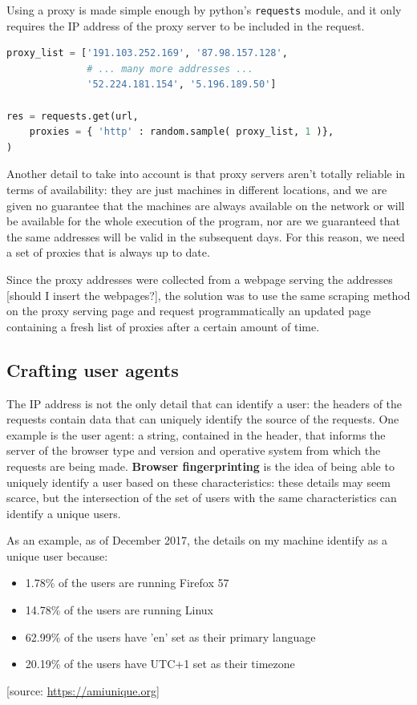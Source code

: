 \documentclass[LaM,binding=0.6cm]{sapthesis}
\begin{document}
Using a proxy is made simple enough by python's \texttt{requests} module, and it only requires the IP address of the proxy server to be included in the request.  
\\
\begin{lstlisting}[language=python,firstnumber=1]
proxy_list = ['191.103.252.169', '87.98.157.128', 
              # ... many more addresses ...
              '52.224.181.154', '5.196.189.50']

res = requests.get(url,
    proxies = { 'http' : random.sample( proxy_list, 1 )},
)
\end{lstlisting}

Another detail to take into account is that proxy servers aren't totally reliable in terms of availability: they are just machines in different locations, and we are given no guarantee that the machines are always available on the network or will be available for the whole execution of the program, nor are we guaranteed that the same addresses will be valid in the subsequent days. For this reason, we need a set of proxies that is always up to date. 

Since the proxy addresses were collected from a webpage serving the addresses [should I insert the webpages?], the solution was to use the same scraping method on the proxy serving page and request programmatically an updated page containing a fresh list of proxies after a certain amount of time.  


\subsection{Crafting user agents}

The IP address is not the only detail that can identify a user: the headers of the requests contain data that can uniquely identify the source of the requests. One example is the user agent: a string, contained in the header, that informs the server of the browser type and version and operative system from which the requests are being made. \textbf{Browser fingerprinting} is the idea of being able to uniquely identify a user based on these characteristics: these details may seem scarce, but the intersection of the set of users with the same characteristics can identify a unique users.

As an example, as of December 2017, the details on my machine identify as a unique user because:
\begin{itemize}
\item 1.78\% of the users are running Firefox 57
\item 14.78\% of the users are running Linux
\item 62.99\% of the users have 'en' set as their primary language
\item 20.19\% of the users have UTC+1 set as their timezone
\end{itemize}
[source: \url{https://amiunique.org}]
\end{document}
